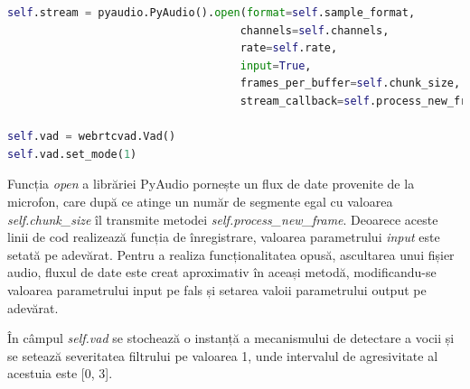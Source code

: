 \documentclass[a4paper,12pt]{book}
\begin{document}
		\begin{lstlisting}[language=Python, caption={Inițializarea fluxului de transmitere a datelor pentru înregistrare.}]	
self.stream = pyaudio.PyAudio().open(format=self.sample_format,
									channels=self.channels,
									rate=self.rate,
									input=True,
									frames_per_buffer=self.chunk_size, 
									stream_callback=self.process_new_frame)

self.vad = webrtcvad.Vad()
self.vad.set_mode(1) \end{lstlisting}
		Funcția \textit{open} a librăriei PyAudio \cite{pyaudio} pornește un flux de date provenite de la microfon, care după ce atinge un număr de segmente egal cu valoarea \textit{self.chunk\_size} îl transmite metodei \textit{self.process\_new\_frame}. Deoarece aceste linii de cod realizează funcția de înregistrare, valoarea parametrului \textit{input} este setată pe adevărat. Pentru a realiza funcționalitatea opusă, ascultarea unui fișier audio, fluxul de date este creat aproximativ în aceași metodă, modificandu-se valoarea parametrului input pe fals și setarea valoii parametrului output pe adevărat. \par
		
		În câmpul \textit{self.vad} se stochează o instanță a mecanismului de detectare a vocii și se setează severitatea filtrului pe valoarea 1, unde intervalul de agresivitate al acestuia este [0, 3]. \par
\end{document}
